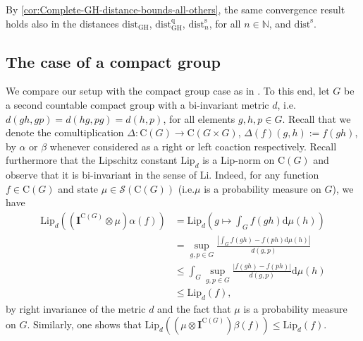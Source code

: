\documentclass{amsart}
\theoremstyle{plain}
\theoremstyle{definition}
\theoremstyle{remark}
\begin{document}
	By \autoref{cor:Complete-GH-distance-bounds-all-others}, the same convergence result holds also in the distances $\mathrm{dist}_\mathrm{GH}$, $\mathrm{dist}_\mathrm{GH}^\mathrm{q}$, $\mathrm{dist}_n^\mathrm{s}$, for all $n \in \mathbb{N}$, and $\mathrm{dist}^\mathrm{s}$.	
	
	
	\subsection{The case of a compact group}
	
	We compare our setup with the compact group case as in \cite{GEvS23}.
	To this end, let $G$ be a second countable compact group with a bi-invariant metric $d$, i.e.\@ $d(gh,gp) = d(hg,pg) = d(h,p)$, for all elements $g,h,p \in G$.
	Recall that we denote the comultiplication $\Delta : \mathrm{C}(G) \rightarrow \mathrm{C}(G \times G)$, $\Delta(f)(g,h) := f(gh)$, by $\alpha$ or $\beta$ whenever considered as a right or left coaction respectively.
	Recall furthermore that the Lipschitz constant $\mathrm{Lip}_d$ is a Lip-norm on $\mathrm{C}(G)$ and observe that it is bi-invariant in the sense of Li.
	Indeed, for any function $f \in \mathrm{C}(G)$ and state $\mu \in \mathcal{S}(\mathrm{C}(G))$ (i.e.\@ $\mu$ is a probability measure on $G$), we have
	\begin{align}
		\mathrm{Lip}_d((\mathbf{I}^{\mathrm{C}(G)} \otimes \mu)\alpha(f))
		&= \mathrm{Lip}_d \left(g \mapsto \int_G f(gh) \mathrm{d}\mu(h) \right) \\
		&= \sup_{g,p \in G} \frac{|\int_G f(gh) - f(ph) \mathrm{d}\mu(h)|}{d(g,p)} \\
		&\leq \int_G \sup_{g,p \in G} \frac{|f(gh)-f(ph)|}{d(g,p)} \mathrm{d}\mu(h) \\
		&\leq \mathrm{Lip}_d(f),
	\end{align}
	by right invariance of the metric $d$ and the fact that $\mu$ is a probability measure on $G$.
	Similarly, one shows that $\mathrm{Lip}_d((\mu \otimes \mathbf{I}^{\mathrm{C}(G)})\beta(f)) \leq \mathrm{Lip}_d(f)$.
	
\end{document}
